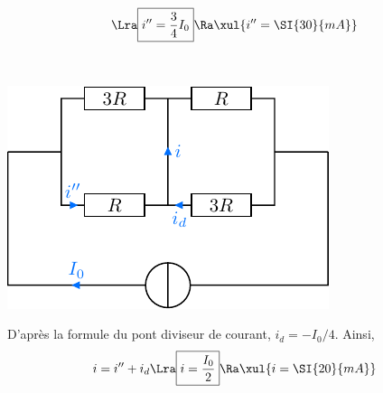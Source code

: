 \documentclass[a4paper, 10pt, garamond, oneside]{book}
\begin{document}
{\begin{enumerate}
\begin{minipage}[t]{0.55\linewidth}
\begin{gather*}
              \\\Lra
              \boxed{i'' = \frac{3}{4}I_0}
              \Ra 
              \xul{i'' = \SI{30}{mA}}
            \end{gather*}
		      \end{minipage}
          \hfill
		      \begin{minipage}[t]{0.4\linewidth}
            ~
            \vspace{-20pt}
			      \begin{center}
		          \includegraphics[width=\linewidth]{diplin_q8}
			      \end{center}
		      \end{minipage}
     D'après la formule du pont diviseur de courant, $i_d=-I_0/4$.
          Ainsi,
            \[
              i = i'' + i_d
              \Lra
              \boxed{i = \frac{I_0}{2}}
              \Ra
              \xul{i = \SI{20}{mA}}
            \]
	\end{enumerate}
}
\end{document}

